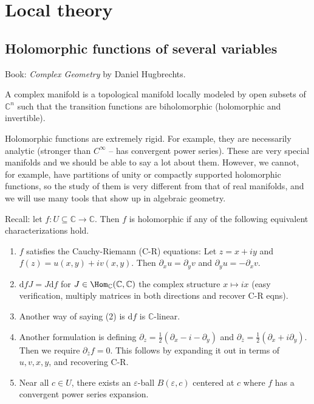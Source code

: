 \chapter{Local theory}

\section{Holomorphic functions of several variables}


Book: \emph{Complex Geometry} by Daniel Hugbrechts.

\begin{definition}\label{1.1.1}
	A complex manifold is a topological manifold locally modeled by open subsets of $\mathbb{C} ^n$ such that the transition functions are biholomorphic (holomorphic and invertible).
\end{definition}

Holomorphic functions are extremely rigid. For example, they are necessarily analytic (stronger than $C^\infty $ -- has convergent power series). These are very special manifolds and we should be able to say a lot about them. However, we cannot, for example, have partitions of unity or compactly supported holomorphic functions, so the study of them is very different from that of real manifolds, and we will use many tools that show up in algebraic geometry.

Recall: let $f : U\subseteq \mathbb{C}  \to \mathbb{C} $. Then $f$ is holomorphic if any of the following equivalent characterizations hold.
\begin{enumerate}
	\item $f$ satisfies the Cauchy-Riemann (C-R) equations: Let $z=x+iy$ and $f(z)=u(x,y)+iv(x,y)$. Then $\partial _xu=\partial _yv$ and $\partial _yu=-\partial _xv$.
	\item $\mathrm{d} fJ=J\mathrm{d}f$ for $J\in \Hom_\mathbb{C} (\mathbb{C} , \mathbb{C} ) $ the complex structure $x\mapsto ix$ (easy verification, multiply matrices in both directions and recover C-R eqns).
	\item Another way of saying (2) is $\mathrm{d} f$ is $\mathbb{C} $-linear.
	\item Another formulation is defining $\partial _z=\frac{1}{2} (\partial _x-i-\partial _y)$ and $\partial _{\overline{z} } =\frac{1}{2} (\partial _x+i \partial _y)$. Then we require $\partial _{\overline{z} } f=0$. This follows by expanding it out in terms of $u,v,x,y$, and recovering C-R.
	\item Near all $c\in U$, there exists an $\varepsilon $-ball $B(\varepsilon ,c)$ centered at $c$ where $f$ has a convergent power series expansion.
\end{enumerate}

